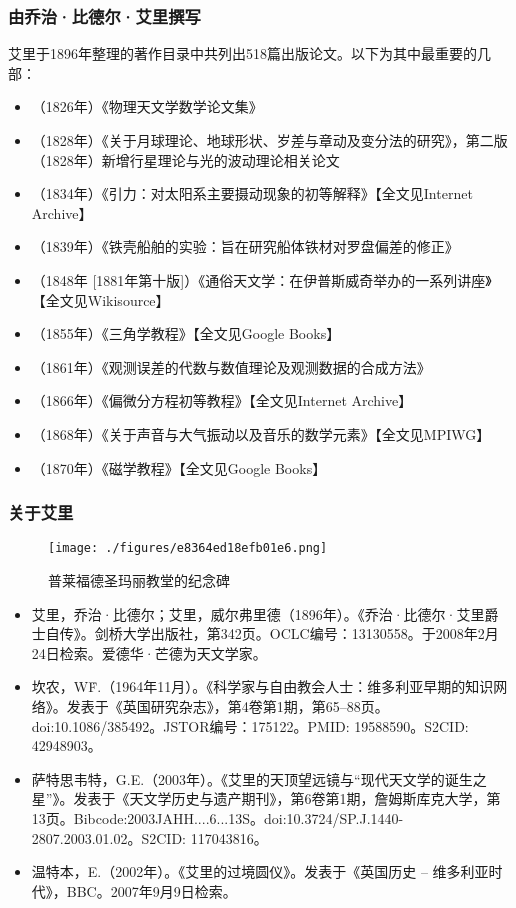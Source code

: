 \subsubsection{由乔治·比德尔·艾里撰写}
艾里于1896年整理的著作目录中共列出518篇出版论文。以下为其中最重要的几部：
\begin{itemize}
\item （1826年）《物理天文学数学论文集》
\item （1828年）《关于月球理论、地球形状、岁差与章动及变分法的研究》，第二版（1828年）新增行星理论与光的波动理论相关论文
\item （1834年）《引力：对太阳系主要摄动现象的初等解释》【全文见Internet Archive】
\item （1839年）《铁壳船舶的实验：旨在研究船体铁材对罗盘偏差的修正》
\item （1848年 [1881年第十版]）《通俗天文学：在伊普斯威奇举办的一系列讲座》【全文见Wikisource】
\item （1855年）《三角学教程》【全文见Google Books】
\item （1861年）《观测误差的代数与数值理论及观测数据的合成方法》
\item （1866年）《偏微分方程初等教程》【全文见Internet Archive】
\item （1868年）《关于声音与大气振动以及音乐的数学元素》【全文见MPIWG】
\item （1870年）《磁学教程》【全文见Google Books】
\end{itemize}
\subsubsection{关于艾里}
\begin{figure}[ht]
\centering
\texttt{[image: ./figures/e8364ed18efb01e6.png]}
\caption{普莱福德圣玛丽教堂的纪念碑} \label{fig_AL_11}
\end{figure}
\begin{itemize}
\item 艾里，乔治·比德尔；艾里，威尔弗里德（1896年）。《乔治·比德尔·艾里爵士自传》。剑桥大学出版社，第342页。OCLC编号：13130558。于2008年2月24日检索。爱德华·芒德为天文学家。
\item 坎农，W\.F.（1964年11月）。《科学家与自由教会人士：维多利亚早期的知识网络》。发表于《英国研究杂志》，第4卷第1期，第65–88页。doi:10.1086/385492。JSTOR编号：175122。PMID: 19588590。S2CID: 42948903。
\item 萨特思韦特，G.E.（2003年）。《艾里的天顶望远镜与“现代天文学的诞生之星”》。发表于《天文学历史与遗产期刊》，第6卷第1期，詹姆斯库克大学，第13页。Bibcode:2003JAHH....6...13S。doi:10.3724/SP.J.1440-2807.2003.01.02。S2CID: 117043816。
\item 温特本，E.（2002年）。《艾里的过境圆仪》。发表于《英国历史 – 维多利亚时代》，BBC。2007年9月9日检索。
\end{itemize}
